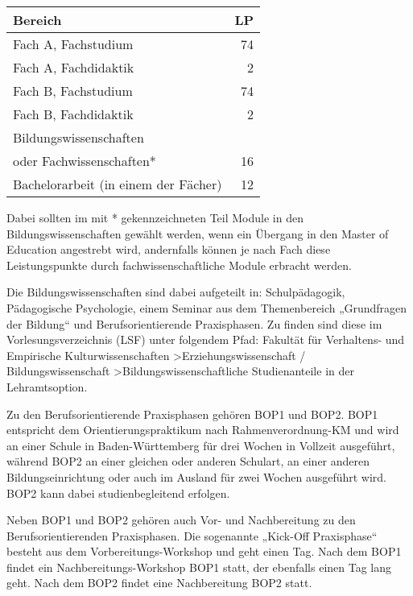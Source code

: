 \begin{table}[htb]

	\begin{tabular*}{\linewidth}{lr}
		\toprule
		Bereich & \gls{LP}\\
		\midrule
		Fach A, Fachstudium & 74\\
		Fach A, Fachdidaktik & \phantom{0}2\\
		\addlinespace
		Fach B, Fachstudium & 74\\
		Fach B, Fachdidaktik & \phantom{0}2\\
		\addlinespace
		Bildungswissenschaften&\\
		oder Fachwissenschaften* & 16\\
		\addlinespace
		Bachelorarbeit (in einem der Fächer) & 12\\
		\bottomrule
	\end{tabular*}

\end{table}
Dabei sollten im mit * gekennzeichneten Teil Module in den Bildungswissenschaften gewählt werden, wenn ein Übergang in den Master of Education angestrebt wird, andernfalls können je nach Fach diese Leistungspunkte durch fachwissenschaftliche Module erbracht werden.

Die Bildungswissenschaften sind dabei aufgeteilt in: Schulpädagogik, Pädagogische Psychologie, einem Seminar aus dem Themenbereich „Grundfragen der Bildung“ und Berufsorientierende Praxisphasen. Zu finden sind diese im Vorlesungsverzeichnis (LSF) unter folgendem Pfad:
Fakultät für Verhaltens- und Empirische Kulturwissenschaften >Erziehungswissenschaft /  Bildungswissenschaft >Bildungswissenschaftliche Studienanteile in der Lehramtsoption.


Zu den Berufsorientierende Praxisphasen gehören BOP1 und BOP2. BOP1 entspricht dem Orientierungspraktikum nach Rahmenverordnung-KM und wird an einer Schule in Baden-Württemberg für drei Wochen in Vollzeit ausgeführt, während BOP2 an einer gleichen oder anderen Schulart, an einer anderen Bildungseinrichtung oder auch im Ausland für zwei Wochen ausgeführt wird. BOP2 kann dabei studienbegleitend erfolgen.

Neben BOP1 und BOP2 gehören auch Vor- und Nachbereitung zu den Berufsorientierenden Praxisphasen. Die sogenannte „Kick-Off Praxisphase“ besteht aus dem Vorbereitungs-Workshop und geht einen Tag. Nach dem BOP1 findet ein Nachbereitungs-Workshop BOP1 statt, der ebenfalls einen Tag lang geht. Nach dem BOP2 findet eine Nachbereitung BOP2 statt.

